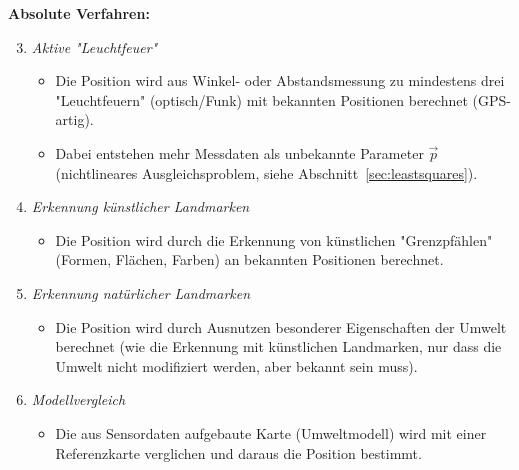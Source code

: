 		\textbf{Absolute Verfahren:}
		\begin{enumerate} \setcounter{enumi}{2}
			\item \emph{Aktive "Leuchtfeuer"}
				\begin{itemize}
					\item Die Position wird aus Winkel- oder Abstandsmessung zu mindestens drei "Leuchtfeuern" (optisch/Funk) mit bekannten Positionen berechnet (GPS-artig).
					\item Dabei entstehen mehr Messdaten als unbekannte Parameter \(\vec{p}\) (nichtlineares Ausgleichsproblem, siehe Abschnitt~\ref{sec:leastsquares}).
				\end{itemize}
			\item \emph{Erkennung künstlicher Landmarken}
				\begin{itemize}
					\item Die Position wird durch die Erkennung von künstlichen "Grenzpfählen" (Formen, Flächen, Farben) an bekannten Positionen berechnet.
				\end{itemize}
			\item \emph{Erkennung natürlicher Landmarken}
				\begin{itemize}
					\item Die Position wird durch Ausnutzen besonderer Eigenschaften der Umwelt berechnet (wie die Erkennung mit künstlichen Landmarken, nur dass die Umwelt nicht modifiziert werden, aber bekannt sein muss).
				\end{itemize}
			\item \emph{Modellvergleich}
				\begin{itemize}
					\item Die aus Sensordaten aufgebaute Karte (Umweltmodell) wird mit einer Referenzkarte verglichen und daraus die Position bestimmt.
				\end{itemize}
		\end{enumerate}

